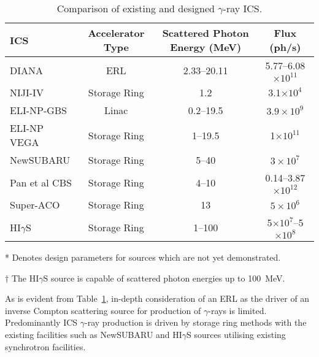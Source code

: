 \documentclass[../main.tex]{subfiles}
\begin{document}
\begin{table}[!h]
\caption{Comparison of existing and designed $\gamma$-ray ICS.}
\begin{threeparttable}
\begin{tabular}{lccc}
\hline\hline
ICS & Accelerator Type & Scattered Photon Energy (\si{\mega\electronvolt}) & Flux (ph/\si{\second}) \\
\hline
DIANA\tnote{*} & ERL & 2.33--20.11 & 5.77--6.08$\times 10^{11}$ \\ 
NIJI-IV \cite{sei2017demonstration} & Storage Ring & 1.2 & 3.1$\times 10^{4}$ \\ 
ELI-NP-GBS\tnote{*} \cite{adriani2014technical} & Linac & 0.2--19.5 & $3.9\times 10^{9}$ \\
ELI-NP VEGA\tnote{*} \cite{tanaka2020current,elinp2019vega} & Storage Ring & 1--19.5 & 1$\times 10^{11}$\\
NewSUBARU \cite{utsunomiya2015gamma} & Storage Ring & 5--40 & $3\times 10^{7}$ \\
Pan et al CBS\tnote{*} \cite{pan2019design} & Storage Ring & 4--10 & 0.14--3.87$\times 10^{12}$ \\ 
Super-ACO \cite{nutarelli1998gamma} & Storage Ring & 13 & $5\times10^{6}$ \\
HI$\gamma$S\tnote{$\dagger$} ~\cite{weller2009research} & Storage Ring & 1--100 & 5$\times 10^{7}$--5$\times 10^{8}$ \\
\hline\hline
\end{tabular}
\begin{tablenotes}
\item[*]{Denotes design parameters for sources which are not yet demonstrated.}
\item[$\dagger$]{The HI$\gamma$S source is capable of scattered photon energies up to 100~\si{\mega\electronvolt}. }
\end{tablenotes}
\end{threeparttable}
\label{tab:gammaray_ICS_comparison}
\end{table}

As is evident from Table~\ref{tab:gammaray_ICS_comparison}, in-depth consideration of an ERL as the driver of an inverse Compton scattering source for production of $\gamma$-rays is limited. Predominantly ICS $\gamma$-ray production is driven by storage ring methods with the existing facilities such as NewSUBARU and HI$\gamma$S sources utilising existing synchrotron facilities. 
\end{document}
